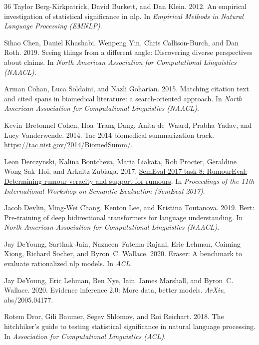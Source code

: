 \documentclass[11pt,a4paper]{article}
\begin{document}
\begin{thebibliography}{36}
Taylor Berg-Kirkpatrick, David Burkett, and Dan Klein. 2012.
\newblock An empirical investigation of statistical significance in nlp.
\newblock In \emph{Empirical Methods in Natural Language Processing (EMNLP)}.

Sihao Chen, Daniel Khashabi, Wenpeng Yin, Chris Callison-Burch, and Dan Roth.
  2019.
\newblock Seeing things from a different angle: Discovering diverse
  perspectives about claims.
\newblock In \emph{North American Association for Computational Linguistics
  (NAACL)}.

Arman Cohan, Luca Soldaini, and Nazli Goharian. 2015.
\newblock Matching citation text and cited spans in biomedical literature: a
  search-oriented approach.
\newblock In \emph{North American Association for Computational Linguistics
  (NAACL)}.

Kevin~Bretonnel Cohen, Hoa~Trang Dang, Anita de~Waard, Prabha Yadav, and Lucy
  Vanderwende. 2014.
\newblock Tac 2014 biomedical summarization track.
\newblock \url{https://tac.nist.gov/2014/BiomedSumm/}.

Leon Derczynski, Kalina Bontcheva, Maria Liakata, Rob Procter, Geraldine Wong
  Sak~Hoi, and Arkaitz Zubiaga. 2017.
\newblock \href {https://doi.org/10.18653/v1/S17-2006} {{S}em{E}val-2017 task
  8: {R}umour{E}val: Determining rumour veracity and support for rumours}.
\newblock In \emph{Proceedings of the 11th International Workshop on Semantic
  Evaluation (SemEval-2017)}.

Jacob Devlin, Ming-Wei Chang, Kenton Lee, and Kristina Toutanova. 2019.
\newblock Bert: Pre-training of deep bidirectional transformers for language
  understanding.
\newblock In \emph{North American Association for Computational Linguistics
  (NAACL)}.

Jay DeYoung, Sarthak Jain, Nazneen~Fatema Rajani, Eric Lehman, Caiming Xiong,
  Richard Socher, and Byron~C. Wallace. 2020{}.
\newblock Eraser: A benchmark to evaluate rationalized nlp models.
\newblock In \emph{ACL}.

Jay DeYoung, Eric Lehman, Ben Nye, Iain~James Marshall, and Byron~C. Wallace.
  2020{}.
\newblock Evidence inference 2.0: More data, better models.
\newblock \emph{ArXiv}, abs/2005.04177.

Rotem Dror, Gili Baumer, Segev Shlomov, and Roi Reichart. 2018.
\newblock The hitchhiker's guide to testing statistical significance in natural
  language processing.
\newblock In \emph{Association for Computational Linguistics (ACL)}.


\end{thebibliography}
\end{document}
